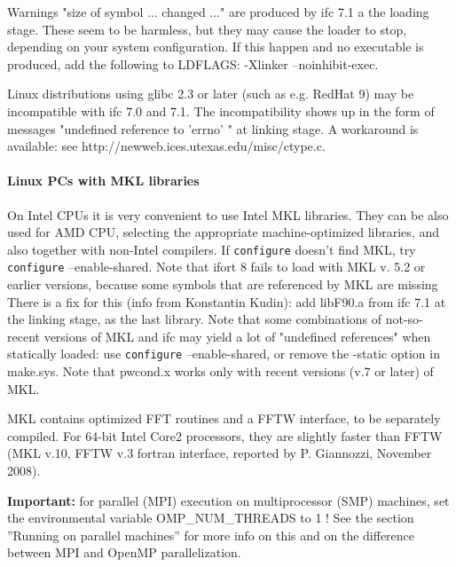 \documentclass[12pt,a4paper]{article}
\begin{document}
Warnings "size of symbol ... changed ..." are produced by ifc 7.1 a
the loading stage. These seem to be harmless, but they may cause the
loader to stop, depending on your system configuration. If this happen
and no executable is produced, add the following to LDFLAGS: -Xlinker
--noinhibit-exec. 

Linux distributions using glibc 2.3 or later (such as e.g. RedHat 9) may be
incompatible with ifc 7.0 and 7.1. The incompatibility shows up in the form
of messages "undefined reference to 'errno' " at linking stage. A workaround
is available: see http://newweb.ices.utexas.edu/misc/ctype.c.

\paragraph{Linux PCs with MKL libraries}
On Intel CPUs it is very convenient to use Intel MKL libraries. They can be
also used for AMD CPU, selecting the appropriate machine-optimized
libraries, and also together with non-Intel compilers.
If \texttt{configure} doesn't find MKL, try \texttt{configure} --enable-shared. 
Note that ifort 8 fails to load with MKL v. 5.2 or earlier
versions, because some symbols that are referenced by MKL are missing
There is a fix for this (info from Konstantin Kudin): add libF90.a from ifc
7.1 at the linking stage, as the last library. Note that some combinations of
not-so-recent versions of MKL and ifc may yield a lot of "undefined
references" when statically loaded: use \texttt{configure} --enable-shared, or
remove the -static option in make.sys. Note that pwcond.x works only
with recent versions (v.7 or later) of MKL.

MKL contains optimized FFT routines and a FFTW interface, to be separately
compiled. For 64-bit Intel Core2 processors, they are slightly faster than 
FFTW (MKL v.10, FFTW v.3 fortran interface, reported by P. Giannozzi,
November 2008). 

{\bf Important:} for parallel (MPI) execution on multiprocessor (SMP)
machines, set the environmental variable OMP\_NUM\_THREADS to 1 ! See
the section  ''Running on parallel machines'' for more info on this
and on the difference between MPI and OpenMP parallelization. 
\end{document}
